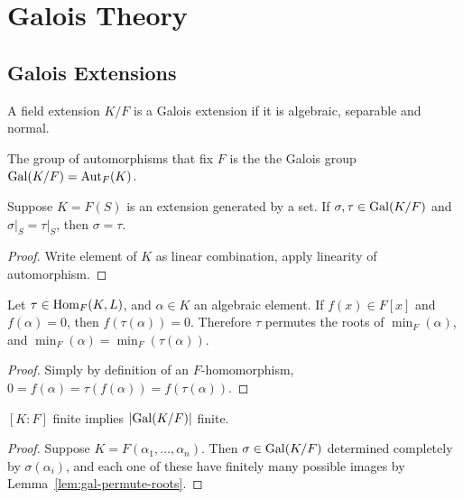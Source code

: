 \section{Galois Theory}\label{sec:galois}

\subsection{Galois Extensions}

\begin{definition}
    A field extension \(K/F\) is a Galois extension
    if it is algebraic, separable and normal.
\end{definition}
\begin{definition}
    The group of automorphisms that fix \(F\)
    is the the Galois group \(\operatorname{Gal}(K/F) = \operatorname{Aut}_F(K)\).
\end{definition}

\begin{lemma}
    Suppose \(K = F(S)\) is an extension generated by a set.
    If \(\sigma,\tau \in \operatorname{Gal}(K/F)\) and \(\sigma\vert_S = \tau\vert_S\),
    then \(\sigma  = \tau\).
\end{lemma}
\begin{proof}
    Write element of \(K\) as linear combination,
    apply linearity of automorphism.
\end{proof}
\begin{lemma}\label{lem:gal-permute-roots}
    Let \(\tau \in \operatorname{Hom}_F(K,L)\), and \(\alpha \in K\) an algebraic element.
    If \(f(x) \in F[x]\) and \(f(\alpha) = 0\),
    then \(f(\tau(\alpha)) = 0\).
    Therefore \(\tau\) permutes the roots of \(\min_F(\alpha)\),
    and \(\min_F(\alpha) = \min_F(\tau(\alpha))\).
\end{lemma}
\begin{proof}
    Simply by definition of an \(F\)-homomorphism,
    \(0 = f(\alpha) = \tau(f(\alpha)) = f(\tau(\alpha))\).
\end{proof}
\begin{corollary}
    \([K:F]\) finite implies \(\abs{\operatorname{Gal}(K/F)}\) finite.
\end{corollary}
\begin{proof}
    Suppose \(K = F(\alpha_1,\hdots,\alpha_n)\).
    Then \(\sigma \in \operatorname{Gal}(K/F)\) determined completely by \(\sigma(\alpha_i)\),
    and each one of these have finitely many possible images
    by Lemma~\ref{lem:gal-permute-roots}.
\end{proof}

